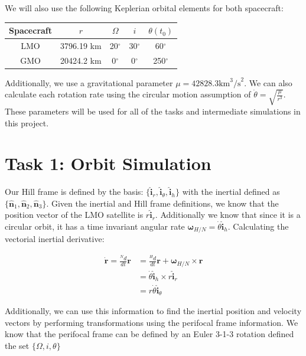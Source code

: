 \documentclass[paper]{aiaaNew}
\begin{document}
We will also use the following Keplerian orbital elements for both spacecraft:

\begin{center}
 \begin{tabular}{||c c c c c||} 
 \hline
 Spacecraft & $r$ & $\Omega$ & $i$ & $\theta(t_0)$\\ [0.5ex] 
 \hline\hline
 LMO & 3796.19 km & 20$^\circ$ & 30$^\circ$ & 60$^\circ$ \\ 
 \hline
 GMO & 20424.2 km & 0$^\circ$ & 0$^\circ$ & 250$^\circ$ \\
 \hline
\end{tabular}
\end{center}

Additionally, we use a gravitational parameter $\mu = 42828.3 \text{km}^3 \text{/s}^2$. We can also calculate each rotation rate using the circular motion assumption of $\dot{\theta} = \sqrt { \frac{\mu}{r^3}}$. These parameters will be used for all of the tasks and intermediate simulations in this project.



\section*{Task 1: Orbit Simulation}
Our Hill frame is defined by the basis: $\{\bm{\hat{i}}_r, \bm{\hat{i}}_\theta, \bm{\hat{i}}_h \}$ with the inertial defined as $\{\bm{\hat{n}}_1, \bm{\hat{n}}_2, \bm{\hat{n}}_3 \}$. Given the inertial and Hill frame definitions, we know that the position vector of the LMO satellite is $r\bm{\hat{i}}_r$. Additionally we know that since it is a circular orbit, it has a time invariant angular rate ${\bm{\omega}}_{H/N} = \dot{\theta}\mathbf{\hat{i}}_h$. Calculating the vectorial inertial derivative:

\begin{align}
	\dot{\bm{r}} = \frac{^N d}{dt}\bm{r} &= \frac{^H d}{dt}\bm{r} + \bm{\omega}_{H/N} \times \bm{r} \\
	&= \dot{\theta}\bm{\hat{i}}_h \times r\bm{\hat{i}}_r \\
	&= r\dot{\theta} \bm{\hat{i}}_\theta
\end{align}

Additionally, we can use this information to find the inertial position and velocity vectors by performing transformations using the perifocal frame information. We know that the perifocal frame can be defined by an Euler 3-1-3 rotation defined the set $\{\Omega, i, \theta \}$
\end{document}
